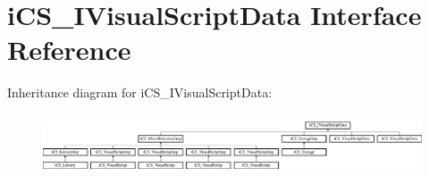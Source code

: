 \hypertarget{interfacei_c_s___i_visual_script_data}{\section{i\+C\+S\+\_\+\+I\+Visual\+Script\+Data Interface Reference}
\label{interfacei_c_s___i_visual_script_data}
}
Inheritance diagram for i\+C\+S\+\_\+\+I\+Visual\+Script\+Data\+:\begin{figure}[H]
\begin{center}
\leavevmode
\includegraphics[height=1.794872cm]{interfacei_c_s___i_visual_script_data}
\end{center}
\end{figure}
